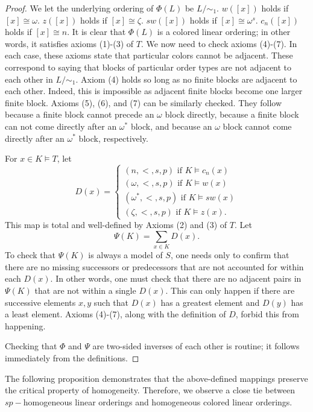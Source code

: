 \documentclass[11pt]{amsart}
\theoremstyle{definition}
\begin{document}
\begin{proof}
We let the underlying ordering of $\Phi(L)$ be $L/\sim_1$.
$w([x])$ holds if $[x]\cong\omega$.
$z([x])$ holds if $[x]\cong\zeta$.
$sw([x])$ holds if $[x]\cong\omega^s$.
$c_n([x])$ holds if $[x]\cong n$.
It is clear that $\Phi(L)$ is a colored linear ordering; in other words, it satisfies axioms (1)-(3) of $T$.
We now need to check axioms (4)-(7).
In each case, these axioms state that particular colors cannot be adjacent.
These correspond to saying that blocks of particular order types are not adjacent to each other in $L/\sim_1$.
Axiom (4) holds so long as no finite blocks are adjacent to each other.
Indeed, this is impossible as adjacent finite blocks become one larger finite block.
Axioms (5), (6), and (7) can be similarly checked.
They follow because a finite block cannot precede an $\omega$ block directly, because a finite block can not come directly after an $\omega^*$ block, and because an $\omega$ block cannot come directly after an $\omega^*$ block, respectively.

For $x\in K\models T$, let
\[
D(x) = \begin{cases}
(n,<,s,p) \text{ if } K\models c_n(x) \\
(\omega,<,s,p) \text{ if } K\models w(x) \\
(\omega^*,<,s,p) \text{ if } K\models sw(x) \\
(\zeta,<,s,p) \text{ if } K\models z(x).
\end{cases}
\]
This map is total and well-defined by Axioms (2) and (3) of $T$.
Let
\[\Psi(K)=\sum_{x\in K} D(x). \]
To check that $\Psi(K)$ is always a model of $S$, one needs only to confirm that there are no missing successors or predecessors that are not accounted for within each $D(x)$.
In other words, one must check that there are no adjacent pairs in $\Psi(K)$ that are not within a single $D(x)$.
This can only happen if there are successive elements $x,y$ such that $D(x)$ has a greatest element and $D(y)$ has a least element.
Axioms (4)-(7), along with the definition of $D$, forbid this from happening.

Checking that $\Phi$ and $\Psi$ are two-sided inverses of each other is routine; it follows immediately from the definitions.
\end{proof}

The following proposition demonstrates that the above-defined mappings preserve the critical property of homogeneity.
Therefore, we observe a close tie between $sp-$homogeneous linear orderings and homogeneous colored linear orderings.
\end{document}
